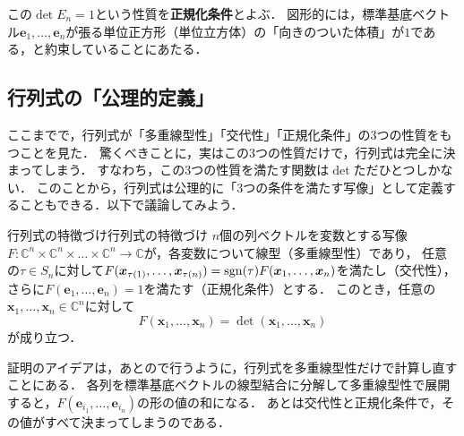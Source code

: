 この$\det E_n = 1$という性質を\textbf{正規化条件}とよぶ．
図形的には，標準基底ベクトル$\bm{e}_1, \dots, \bm{e}_n$が張る単位正方形（単位立方体）の「向きのついた体積」が$1$である，と約束していることにあたる．

\subsection{行列式の「公理的定義」}

ここまでで，行列式が「多重線型性」「交代性」「正規化条件」の$3$つの性質をもつことを見た．
驚くべきことに，実はこの$3$つの性質だけで，行列式は完全に決まってしまう．
すなわち，この$3$つの性質を満たす関数は$\det$ただひとつしかない．
このことから，行列式は公理的に「$3$つの条件を満たす写像」として定義することもできる．以下で議論してみよう．

\begin{prop}{行列式の特徴づけ}{行列式の特徴づけ}
$n$個の列ベクトルを変数とする写像$F \colon \mathbb{C}^n \times \mathbb{C}^n \times \dots \times \mathbb{C}^n \to \mathbb{C}$が，各変数について線型（多重線型性）であり，
任意の$\tau \in S_n$に対して$F(\bm{x}_{\tau(1)}, \dots, \bm{x}_{\tau(n)}) = \operatorname{sgn}(\tau) F(\bm{x}_1, \dots, \bm{x}_n)$を満たし（交代性），
さらに$F(\bm{e}_1, \dots, \bm{e}_n) = 1$を満たす（正規化条件）とする．
このとき，任意の$\bm{x}_1, \dots, \bm{x}_n \in \mathbb{C}^n$に対して
\[
  F(\bm{x}_1, \dots, \bm{x}_n) = \det(\bm{x}_1, \dots, \bm{x}_n)
\]
が成り立つ．
\end{prop}

証明のアイデアは，あとので行うように，行列式を多重線型性だけで計算し直すことにある．
各列を標準基底ベクトルの線型結合に分解して多重線型性で展開すると，$F(\bm{e}_{i_1}, \dots, \bm{e}_{i_n})$の形の値の和になる．
あとは交代性と正規化条件で，その値がすべて決まってしまうのである．


